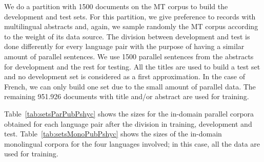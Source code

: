 \documentclass[a4paper,11pt]{article}
\begin{document}
We do a partition with 1500 documents on the MT corpus to build the development and test sets. For this partition, we give preference to
records with multilingual abstracts and, again, we sample randomly the MT corpus according to the weight of its data source. The division between development and test is done differently for every language pair with the purpose of having a similar amount of parallel sentences. We use 1500 parallel sentences from the abstracts for development and the rest for testing. All the titles are used to build a test set and no development set is considered as a first approximation. In the case of French, we can only build one set due to the small amount of parallel data. The remaining 951.926 documents with title and/or abstract are used for training.

Table~\ref{tab:setsParPubPshyc} shows the sizes for the in-domain parallel corpora obtained for each language pair after the division in training, development and test. Table~\ref{tab:setsMonoPubPshyc} shows the sizes of the in-domain monolingual corpora for the four languages involved; in this case, all the data are used for training.
\end{document}
